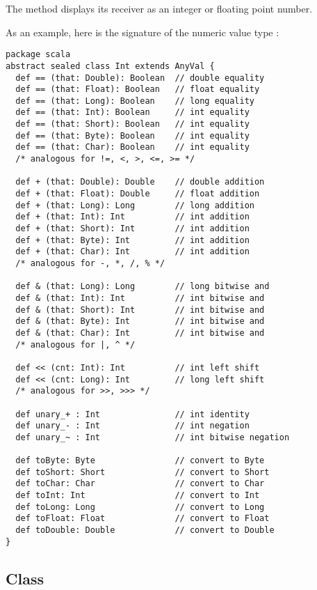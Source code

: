 {The  method displays its receiver as an integer or
floating point number.

\example As an example, here is the signature of the numeric value type :

\begin{lstlisting}
package scala 
abstract sealed class Int extends AnyVal {
  def == (that: Double): Boolean  // double equality
  def == (that: Float): Boolean   // float equality
  def == (that: Long): Boolean    // long equality
  def == (that: Int): Boolean     // int equality
  def == (that: Short): Boolean   // int equality
  def == (that: Byte): Boolean    // int equality
  def == (that: Char): Boolean    // int equality
  /* analogous for !=, <, >, <=, >= */

  def + (that: Double): Double    // double addition
  def + (that: Float): Double     // float addition
  def + (that: Long): Long        // long addition
  def + (that: Int): Int          // int addition
  def + (that: Short): Int        // int addition
  def + (that: Byte): Int         // int addition
  def + (that: Char): Int         // int addition
  /* analogous for -, *, /, % */
  
  def & (that: Long): Long        // long bitwise and
  def & (that: Int): Int          // int bitwise and
  def & (that: Short): Int        // int bitwise and
  def & (that: Byte): Int         // int bitwise and
  def & (that: Char): Int         // int bitwise and
  /* analogous for |, ^ */

  def << (cnt: Int): Int          // int left shift
  def << (cnt: Long): Int         // long left shift
  /* analogous for >>, >>> */

  def unary_+ : Int               // int identity
  def unary_- : Int               // int negation
  def unary_~ : Int               // int bitwise negation

  def toByte: Byte                // convert to Byte
  def toShort: Short              // convert to Short
  def toChar: Char                // convert to Char
  def toInt: Int                  // convert to Int
  def toLong: Long                // convert to Long
  def toFloat: Float              // convert to Float
  def toDouble: Double            // convert to Double
}
\end{lstlisting}

\subsection{Class \large{}}
\label{sec:cls-boolean}

}
